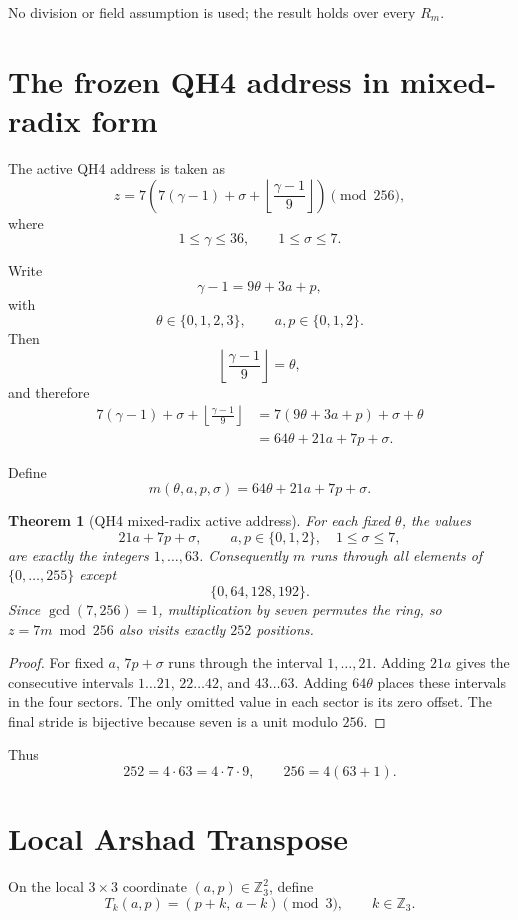 \documentclass[11pt]{article}
\newtheorem{theorem}{Theorem}
\theoremstyle{definition}
\newcommand{\Z}{\mathbb Z}
\begin{document}
No division or field assumption is used; the result holds over every $R_m$.

\section{The frozen QH4 address in mixed-radix form}
The active QH4 address is taken as
\[
z
=
7\left(
7(\gamma-1)+\sigma+
\left\lfloor\frac{\gamma-1}{9}\right\rfloor
\right)
\pmod{256},
\]
where
\[
1\le\gamma\le36,\qquad1\le\sigma\le7.
\]

Write
\[
\gamma-1=9\theta+3a+p,
\]
with
\[
\theta\in\{0,1,2,3\},\qquad a,p\in\{0,1,2\}.
\]
Then
\[
\left\lfloor\frac{\gamma-1}{9}\right\rfloor=\theta,
\]
and therefore
\begin{align*}
7(\gamma-1)+\sigma+\left\lfloor\frac{\gamma-1}{9}\right\rfloor
&=
7(9\theta+3a+p)+\sigma+\theta\\
&=
64\theta+21a+7p+\sigma.
\end{align*}

Define
\[
m(\theta,a,p,\sigma)=64\theta+21a+7p+\sigma.
\]

\begin{theorem}[QH4 mixed-radix active address]\label{thm:qaddr}
For each fixed $\theta$, the values
\[
21a+7p+\sigma,
\qquad
a,p\in\{0,1,2\},\quad1\le\sigma\le7,
\]
are exactly the integers $1,\ldots,63$. Consequently $m$ runs through all elements of $\{0,\ldots,255\}$ except
\[
\{0,64,128,192\}.
\]
Since $\gcd(7,256)=1$, multiplication by seven permutes the ring, so $z=7m\bmod256$ also visits exactly $252$ positions.
\end{theorem}

\begin{proof}
For fixed $a$, $7p+\sigma$ runs through the interval $1,\ldots,21$. Adding $21a$ gives the consecutive intervals $1\ldots21$, $22\ldots42$, and $43\ldots63$. Adding $64\theta$ places these intervals in the four sectors. The only omitted value in each sector is its zero offset. The final stride is bijective because seven is a unit modulo $256$.
\end{proof}

Thus
\[
252=4\cdot63=4\cdot7\cdot9,
\qquad
256=4(63+1).
\]

\section{Local Arshad Transpose}
On the local $3\times3$ coordinate $(a,p)\in\Z_3^2$, define
\[
T_k(a,p)=(p+k,\ a-k)\pmod3,
\qquad k\in\Z_3.
\]
\end{document}
